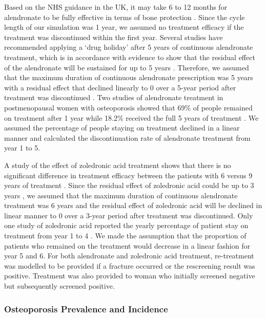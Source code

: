 Based on the NHS guidance in the UK, it may take 6 to 12 months for alendronate to be fully effective in terms of bone protection \cite{4-34}. Since the cycle length of our simulation was 1 year, we assumed no treatment efficacy if the treatment was discontinued within the first year. Several studies have recommended applying a `drug holiday' after 5 years of continuous alendronate treatment, which is in accordance with evidence to show that the residual effect of the alendronate will be sustained for up to 5 years \cite{4-35,4-36}. Therefore, we assumed that the maximum duration of continuous alendronate prescription was 5 years with a residual effect that declined linearly to 0 over a 5-year period after treatment was discontinued \cite{4-37}. Two studies of alendronate treatment in postmenopausal women with osteoporosis showed that 69\% of people remained on treatment after 1 year \cite{4-38} while 18.2\% received the full 5 years of treatment \cite{4-39}. We assumed the percentage of people staying on treatment declined in a linear manner and calculated the discontinuation rate of alendronate treatment from year 1 to 5.

A study of the effect of zoledronic acid treatment shows that there is no significant difference in treatment efficacy between the patients with 6 versus 9 years of treatment \cite{4-40}. Since the residual effect of zoledronic acid could be up to 3 years \cite{4-30}, we assumed that the maximum duration of continuous alendronate treatment was 6 years and the residual effect of zoledronic acid will be declined in linear manner to 0 over a 3-year period after treatment was discontinued. Only one study of zoledronic acid reported the yearly percentage of patient stay on treatment from year 1 to 4 \cite{4-41}. We made the assumption that the proportion of patients who remained on the treatment would decrease in a linear fashion for year 5 and 6. For both alendronate and zoledronic acid treatment, re-treatment was modelled to be provided if a fracture occurred or the rescreening result was positive. Treatment was also provided to woman who initially screened negative but subsequently screened positive.

\subsubsection{Osteoporosis Prevalence and Incidence}

